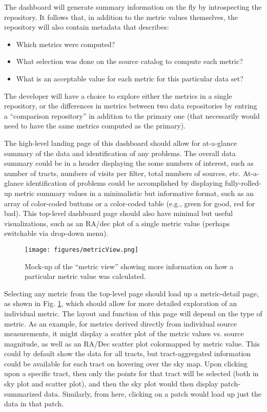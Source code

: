 The dashboard will generate summary information on the fly by introspecting the repository.
It follows that, in addition to the metric values themselves, the repository will also contain metadata that describes:
\begin{itemize}
    \item{Which metrics were computed?}
    \item{What selection was done on the source catalog to compute each metric?}
    \item{What is an acceptable value for each metric for this particular data set?}
\end{itemize}
The developer will have a choice to explore either the metrics in a single repository, or the differences in metrics between two data repositories by entring a ``comparison repository'' in addition to the primary one (that necessarily would need to have the same metrics computed as the primary).

The high-level landing page of this dashboard should allow for at-a-glance summary of the data and identification of any problems.
The overall data summary could be in a header displaying the some numbers of interest, such as number of tracts, numbers of visits per filter, total numbers of sources, etc.
At-a-glance identification of problems could be accomplished by displaying fully-rolled-up metric summary values in a minimalistic but informative format, such as an array of color-coded buttons or a color-coded table (e.g., green for good, red for bad).
This top-level dashboard page should also have minimal but useful visualizations, such as an RA/dec plot of a single metric value (perhaps switchable via drop-down menu).

\begin{figure}
  \begin{center}
    \texttt{[image: figures/metricView.png]}
  \end{center}
  \caption{
    Mock-up of the ``metric view'' showing more information on how a particular metric value was calculated.
  }
  \label{fig:comp:drill:metric}
\end{figure}

Selecting any metric from the top-level page should load up a metric-detail page, as shown in Fig. \ref{fig:comp:drill:metric}, which should allow for more detailed exploration of an individual metric.
The layout and function of this page will depend on the type of metric.
As an example, for metrics derived directly from individual source measurements, it might display a scatter plot of the metric values vs. source magnitude, as well as an RA/Dec scatter plot colormapped by metric value.
This could by default show the data for all tracts, but tract-aggregated information could be available for each tract on hovering over the sky map.
Upon clicking upon a specific tract, then only the points for that tract will be selected (both in sky plot and scatter plot), and then the sky plot would then display patch-summarized data.
Similarly, from here, clicking on a patch would load up just the data in that patch.

